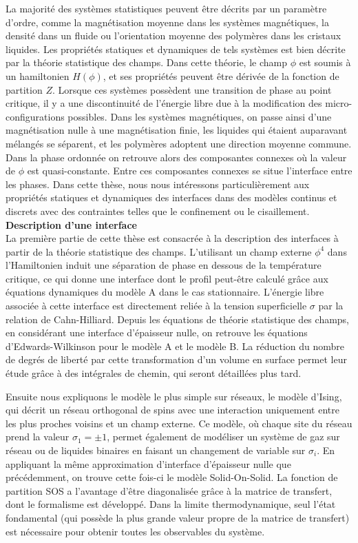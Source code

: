 La majorité des systèmes statistiques peuvent être décrits par un paramètre d'ordre, comme la magnétisation moyenne dans les systèmes magnétiques, la densité dans un fluide ou l'orientation moyenne des polymères dans les cristaux liquides. Les propriétés statiques et dynamiques de tels systèmes est bien décrite par la théorie statistique des champs. Dans cette théorie, le champ $\phi$ est soumis à un hamiltonien $H(\phi)$, et ses propriétés peuvent être dérivée de la fonction de partition $Z$.
Lorsque ces systèmes possèdent une transition de phase au point critique, il y a une discontinuité de l'énergie libre due à la modification des micro-configurations possibles. 
Dans les systèmes magnétiques, on passe ainsi d'une magnétisation nulle à une magnétisation finie, les liquides qui étaient auparavant mélangés se séparent, et les polymères adoptent une direction moyenne commune. Dans la phase ordonnée on retrouve alors des composantes connexes où la valeur de $\phi$ est quasi-constante. Entre ces composantes connexes se situe l'interface entre les phases. 
Dans cette thèse, nous nous intéressons particulièrement aux propriétés statiques et dynamiques des interfaces dans des modèles continus et discrets avec des contraintes telles que le confinement ou le cisaillement. \\


{\bf \large Description d'une interface} \\

La première partie de cette thèse est consacrée à la description des interfaces à partir de la théorie statistique des champs. L'utilisant un champ externe $\phi^4$ dans l'Hamiltonien induit une séparation de phase en dessous de la température critique, ce qui donne une interface dont le profil peut-être calculé grâce aux équations dynamiques du modèle A dans le cas stationnaire. L'énergie libre associée à cette interface est directement reliée à la tension superficielle $\sigma$ par la relation de Cahn-Hilliard.
Depuis les équations de théorie statistique des champs, en considérant une interface d'épaisseur nulle, on retrouve les équations d'Edwards-Wilkinson pour le modèle A et le modèle B. La réduction du nombre de degrés de liberté par cette transformation d'un volume en surface permet leur étude grâce à des intégrales de chemin, qui seront détaillées plus tard.

Ensuite nous expliquons le modèle le plus simple sur réseaux, le modèle d'Ising, qui décrit un réseau orthogonal de spins avec une interaction uniquement entre les plus proches voisins et un champ externe. Ce modèle, où chaque site du réseau prend la valeur $\sigma_1 = \pm1$, permet également de modéliser un système de gaz sur réseau ou de liquides binaires en faisant un changement de variable sur $\sigma_i$. En appliquant la même approximation d'interface d'épaisseur nulle que précédemment, on trouve cette fois-ci le modèle Solid-On-Solid. La fonction de partition SOS a l'avantage d'être diagonalisée grâce à la matrice de transfert, dont le formalisme est développé. Dans la limite thermodynamique, seul l'état fondamental (qui possède la plus grande valeur propre de la matrice de transfert) est nécessaire pour obtenir toutes les observables du système. 

